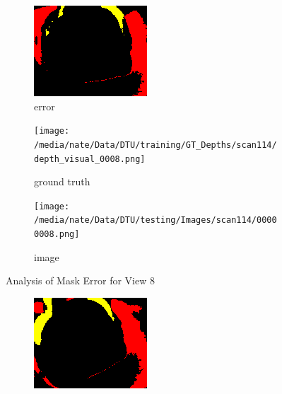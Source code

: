 \documentclass{article}
\begin{document}
\begin{figure}
\begin{subfigure}{0.3\textwidth}
		\includegraphics[width=\textwidth]{./output/008_error.png}
		\caption{error}
		\label{fig:error8}
	\end{subfigure}
	\hfill
	\centering
	\begin{subfigure}{0.3\textwidth}
		\centering
		\texttt{[image: /media/nate/Data/DTU/training/GT\_Depths/scan114/depth\_visual\_0008.png]}
		\caption{ground truth}
		\label{fig:gt8}
	\end{subfigure}
	\hfill
	\centering
	\begin{subfigure}{0.3\textwidth}
		\centering
		\texttt{[image: /media/nate/Data/DTU/testing/Images/scan114/00000008.png]}
		\caption{image}
		\label{fig:img8}
	\end{subfigure}
	\hfill
	\caption{Analysis of Mask Error for View 8}
	\label{fig:error_analys8}
\end{figure}\begin{figure}
	\centering
	\begin{subfigure}{0.3\textwidth}
		\centering
		\includegraphics[width=\textwidth]{./output/009_error.png}

\end{subfigure}
\end{figure}
\end{document}
